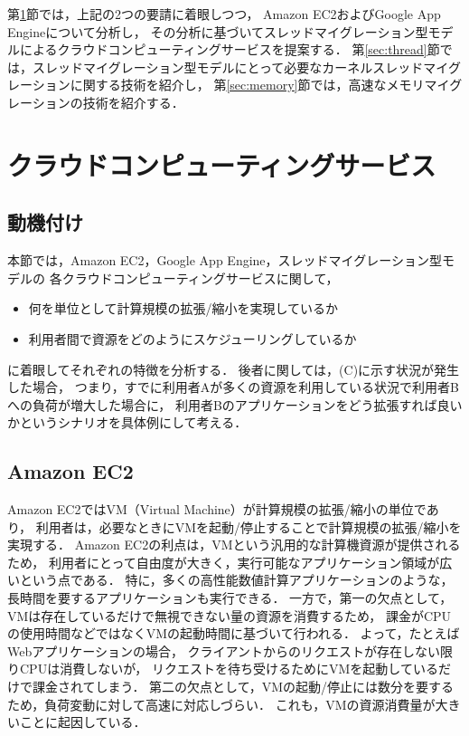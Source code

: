 \documentclass[10pt]{jsarticle}
\begin{document}
第\ref{sec:cloud}節では，上記の2つの要請に着眼しつつ，
Amazon EC2およびGoogle App Engineについて分析し，
その分析に基づいてスレッドマイグレーション型モデルによるクラウドコンピューティングサービスを提案する．
第\ref{sec:thread}節では，スレッドマイグレーション型モデルにとって必要なカーネルスレッドマイグレーションに関する技術を紹介し，
第\ref{sec:memory}節では，高速なメモリマイグレーションの技術を紹介する．

\section{クラウドコンピューティングサービス}
\label{sec:cloud}

\subsection{動機付け}

本節では，Amazon EC2，Google App Engine，スレッドマイグレーション型モデルの
各クラウドコンピューティングサービスに関して，
\begin{itemize}
\item 何を単位として計算規模の拡張/縮小を実現しているか
\item 利用者間で資源をどのようにスケジューリングしているか
\end{itemize}
に着眼してそれぞれの特徴を分析する．
後者に関しては，(C)に示す状況が発生した場合，
つまり，すでに利用者Aが多くの資源を利用している状況で利用者Bへの負荷が増大した場合に，
利用者Bのアプリケーションをどう拡張すれば良いかというシナリオを具体例にして考える．

\subsection{Amazon EC2}

Amazon EC2ではVM（Virtual Machine）が計算規模の拡張/縮小の単位であり，
利用者は，必要なときにVMを起動/停止することで計算規模の拡張/縮小を実現する．
Amazon EC2の利点は，VMという汎用的な計算機資源が提供されるため，
利用者にとって自由度が大きく，実行可能なアプリケーション領域が広いという点である．
特に，多くの高性能数値計算アプリケーションのような，長時間を要するアプリケーションも実行できる．
一方で，第一の欠点として，VMは存在しているだけで無視できない量の資源を消費するため，
課金がCPUの使用時間などではなくVMの起動時間に基づいて行われる．
よって，たとえばWebアプリケーションの場合，
クライアントからのリクエストが存在しない限りCPUは消費しないが，
リクエストを待ち受けるためにVMを起動しているだけで課金されてしまう．
第二の欠点として，VMの起動/停止には数分を要するため，負荷変動に対して高速に対応しづらい．
これも，VMの資源消費量が大きいことに起因している．
\end{document}
